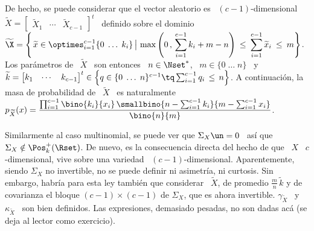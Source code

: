 De hecho, se puede considerar que el vector aleatorio es \ $(c-1)$-dimensional \
$\widetilde{X}     =    \begin{bmatrix}     \widetilde{X}_1    &     \cdots    &
  \widetilde{X}_{c-1}   \end{bmatrix}^t$   \  definido   sobre   el  dominio   \
$\displaystyle    \widetilde{\X}   =    \left\{    \left.   \widetilde{x}    \in
    \optimes_{i=1}^{c-1} \{ 0 \; \ldots \; k_i\} \, \right| \, \max\left( 0 \, ,
    \,  \sum_{i=1}^{c-1}  k_i  +  m  -  n \right)  \:  \le  \:  \sum_{i=1}^{c-1}
  \widetilde{x}_i \: \le \: m \right\}$. Los par\'ametros de \ $\widetilde{X}$ \
son  entonces \  $n \in  \Nset^*$, \  $m \in  \{  0 \;  \ldots \;  n \}$  \ y  \
$\widetilde{k}     =     \protect\begin{bmatrix}      k_1     &     \cdots     &
  k_{c-1} \end{bmatrix}^t\protect \in \left\{ q \in \{ 0 \; \ldots \; n \}^{c-1}
  \tq \sum_{i=1}^{c-1} q_i  \, \le \, n \right\}$. A  continuaci\'on, la masa de
probabilidad   de  \   $\widetilde{X}$  \   es  naturalmente   \  $\displaystyle
p_{\widetilde{X}}(x)  =  \frac{\prod_{i=1}^{c-1} \bino{k_i\vspace{1mm}}{x_i}  \,
  \smallbino{n   -   \sum_{i=1}^{c-1}   k_i\vspace{2mm}}{m  -   \sum_{i=1}^{c-1}
    x_i}}{\bino{n}{m}}$.

Similarmente al  caso multinomial, se puede ver  que $\Sigma_X \un =  0$ \ as\'i
que \ $\Sigma_X \notin \Pos_k^+(\Rset)$.  De nuevo, es la consecuencia directa del
hecho   de  que   \  $X$   \  $c$-dimensional,   vive  sobre   una   variedad  \
$(c-1)$-dimensional. Aparentemente, siendo $\Sigma_X$ no invertible, no se puede
definir  ni  asimetr\'ia, ni  curtosis.  Sin  embargo,  habr\'ia para  esta  ley
tambi\'en  que  considerar  \   $\widetilde{X}$,  de  promedio  $\frac{m}{n}  \,
\widetilde{k}$ y de covarianza el bloque $(c-1) \times (c-1)$ de $\Sigma_X$, que
es ahora  invertible. $\gamma_{\widetilde{X}}$ \ y  \ $\kappa_{\widetilde{X}}$ \
son bien definidos.  Las expresiones, demasiado pesadas, no  son dadas ac\'a (se
deja al lector como exercicio).


\SZ{Ver si se calcula Phi}


